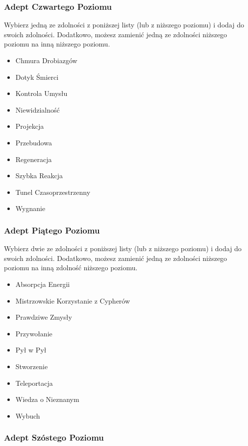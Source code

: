 \subsubsection{Adept Czwartego Poziomu}

Wybierz jedną ze zdolności z poniższej listy (lub z niższego poziomu) i dodaj do swoich zdolności. Dodatkowo, możesz zamienić jedną ze zdolności niższego poziomu na inną niższego poziomu.

\begin{itemize}
\item Chmura Drobiazgów
\item Dotyk Śmierci
\item Kontrola Umysłu
\item Niewidzialność
\item Projekcja
\item Przebudowa
\item Regeneracja
\item Szybka Reakcja
\item Tunel Czasoprzestrzenny
\item Wygnanie
\end{itemize}

\subsubsection{Adept Piątego Poziomu}

Wybierz dwie ze zdolności z poniższej listy (lub z niższego poziomu) i dodaj do swoich zdolności. Dodatkowo, możesz zamienić jedną ze zdolności niższego poziomu na inną zdolność niższego poziomu.

\begin{itemize}
\item Absorpcja Energii
\item Mistrzowskie Korzystanie z Cypherów
\item Prawdziwe Zmysły
\item Przywołanie
\item Pył w Pył
\item Stworzenie
\item Teleportacja
\item Wiedza o Nieznanym
\item Wybuch
\end{itemize}

\subsubsection{Adept Szóstego Poziomu}

